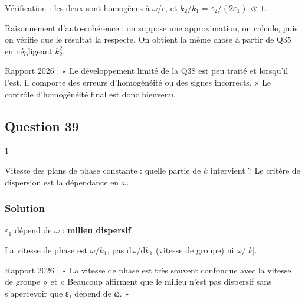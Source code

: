 \documentclass[11pt,a4paper]{article}
\newcommand{\equationajustee}[1]{%
  \sbox{\boiteequation}{$\displaystyle #1$}%
  \ifdim\wd\boiteequation>\linewidth
    \[\resizebox{\linewidth}{!}{\usebox{\boiteequation}}\]%
  \else
    \[#1\]%
  \fi}
\begin{document}
Vérification : les deux sont homogènes à \(\omega/c\), et \(k_2/k_1=\varepsilon_2/(2\varepsilon_1)\ll1\).

\begin{methode}

Raisonnement d'auto-cohérence : on suppose une approximation, on calcule, puis on vérifie que le résultat la respecte. On obtient la même chose à partir de Q35 en négligeant \(k_2^2\).

\end{methode}

\begin{jury}

Rapport 2026 : « Le développement limité de la Q38 est peu traité et lorsqu'il l'est, il comporte des erreurs d'homogénéité ou des signes incorrects. » Le contrôle d'homogénéité final est donc bienvenu.

\end{jury}

\hypertarget{question-39}{%
\subsection{Question 39}\label{question-39}}

\begin{indication}{1}

Vitesse des plans de phase constante : quelle partie de \(k\) intervient ? Le critère de dispersion est la dépendance en \(\omega\).

\end{indication}

\hypertarget{solution-38}{%
\subsubsection{Solution}\label{solution-38}}

\equationajustee{\boxed{v_\varphi=\frac\omega{k_1}=\frac c{\sqrt{\varepsilon_1(\omega)}}}}

\(\varepsilon_1\) dépend de \(\omega\) : \textbf{milieu dispersif}.

\begin{piege}

La vitesse de phase est \(\omega/k_1\), pas \(\mathrm{d}\omega/\mathrm{d}k_1\) (vitesse de groupe) ni \(\omega/|k|\).

\end{piege}

\begin{jury}

Rapport 2026 : « La vitesse de phase est très souvent confondue avec la vitesse de groupe » et « Beaucoup affirment que le milieu n'est pas dispersif sans s'apercevoir que ε₁ dépend de ω. »

\end{jury}
\end{document}
